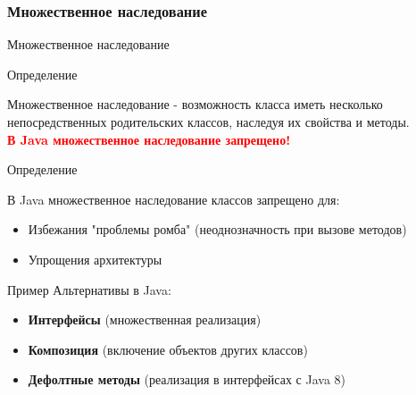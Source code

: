 \documentclass{beamer}
\newenvironment{rusdefinition}[1][Определение]{
    \begin{block}{#1}
}{\end{block}}
\newenvironment{rexample}[1][Пример]{\begin{exampleblock}{#1}}{\end{exampleblock}}
\begin{document}
\subsubsection{Множественное наследование}
\begin{frame}{Множественное наследование}
    
    \begin{rusdefinition}
        \footnotesize
        Множественное наследование - возможность класса иметь несколько непосредственных родительских классов, наследуя их свойства и методы. \\
        \textbf{\textcolor{red}{В Java множественное наследование запрещено!}}
    \end{rusdefinition}

    \vspace{-0.2cm}
    \begin{rusdefinition}
        \footnotesize
        В Java множественное наследование классов запрещено для:
        \begin{itemize}
            \item Избежания "проблемы ромба" (неоднозначность при вызове методов)
            \item Упрощения архитектуры
        \end{itemize}
    \end{rusdefinition}

    \vspace{-0.2cm}
    \begin{rexample}
        \footnotesize
        Альтернативы в Java:
        \begin{itemize}
            \item \textbf{Интерфейсы} (множественная реализация)
            \item \textbf{Композиция} (включение объектов других классов)
            \item \textbf{Дефолтные методы} (реализация в интерфейсах с Java 8)
        \end{itemize}
    \end{rexample}
    
\end{frame}
\end{document}
